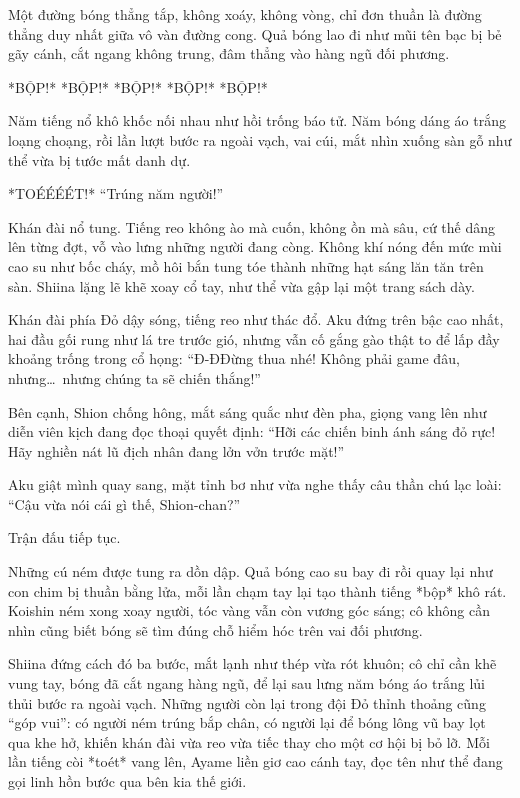 \documentclass[../main.tex]{subfiles}
\begin{document}
Một đường bóng thẳng tắp, không xoáy, không vòng, chỉ đơn thuần là đường thẳng duy nhất giữa vô vàn đường cong. Quả bóng lao đi như mũi tên bạc bị bẻ gãy cánh, cắt ngang không trung, đâm thẳng vào hàng ngũ đối phương.

*BỘP!* *BỘP!* *BỘP!* *BỘP!* *BỘP!*

Năm tiếng nổ khô khốc nối nhau như hồi trống báo tử. Năm bóng dáng áo trắng loạng choạng, rồi lần lượt bước ra ngoài vạch, vai cúi, mắt nhìn xuống sàn gỗ như thể vừa bị tước mất danh dự.

*TOÉÉÉÉT!* ``Trúng năm người!''

Khán đài nổ tung. Tiếng reo không ào mà cuốn, không ồn mà sâu, cứ thế dâng lên từng đợt, vỗ vào lưng những người đang còng. Không khí nóng đến mức mùi cao su như bốc cháy, mồ hôi bắn tung tóe thành những hạt sáng lăn tăn trên sàn. Shiina lặng lẽ khẽ xoay cổ tay, như thể vừa gập lại một trang sách dày.

Khán đài phía Đỏ dậy sóng, tiếng reo như thác đổ. Aku đứng trên bậc cao nhất, hai đầu gối rung như lá tre trước gió, nhưng vẫn cố gắng gào thật to để lấp đầy khoảng trống trong cổ họng: ``Đ-ĐĐừng thua nhé! Không phải game đâu, nhưng\dots\ nhưng chúng ta sẽ chiến thắng!''

Bên cạnh, Shion chống hông, mắt sáng quắc như đèn pha, giọng vang lên như diễn viên kịch đang đọc thoại quyết định: ``Hỡi các chiến binh ánh sáng đỏ rực! Hãy nghiền nát lũ địch nhân đang lởn vởn trước mặt!''

Aku giật mình quay sang, mặt tỉnh bơ như vừa nghe thấy câu thần chú lạc loài: ``Cậu vừa nói cái gì thế, Shion-chan?''

Trận đấu tiếp tục.

Những cú ném được tung ra dồn dập. Quả bóng cao su bay đi rồi quay lại như con chim bị thuần bằng lửa, mỗi lần chạm tay lại tạo thành tiếng *bộp* khô rát. Koishin ném xong xoay người, tóc vàng vẫn còn vương góc sáng; cô không cần nhìn cũng biết bóng sẽ tìm đúng chỗ hiểm hóc trên vai đối phương.

Shiina đứng cách đó ba bước, mắt lạnh như thép vừa rót khuôn; cô chỉ cần khẽ vung tay, bóng đã cắt ngang hàng ngũ, để lại sau lưng năm bóng áo trắng lủi thủi bước ra ngoài vạch. Những người còn lại trong đội Đỏ thỉnh thoảng cũng ``góp vui'': có người ném trúng bắp chân, có người lại để bóng lông vũ bay lọt qua khe hở, khiến khán đài vừa reo vừa tiếc thay cho một cơ hội bị bỏ lỡ. Mỗi lần tiếng còi *toét* vang lên, Ayame liền giơ cao cánh tay, đọc tên như thể đang gọi linh hồn bước qua bên kia thế giới.
\end{document}
